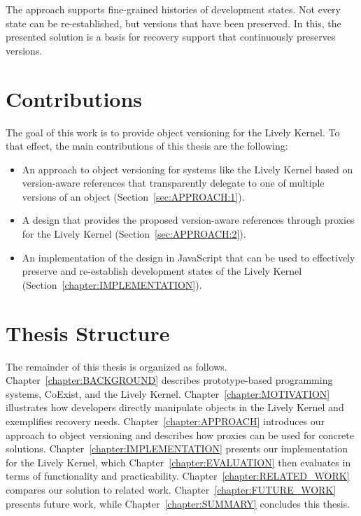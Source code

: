 The approach supports fine-grained histories of development states.
Not every state can be re-established, but versions that have been preserved.
In this, the presented solution is a basis for recovery support that continuously preserves versions.

\section{Contributions}

The goal of this work is to provide object versioning for the Lively Kernel.
To that effect, the main contributions of this thesis are the following:

\begin{itemize}
    \item An approach to object versioning for systems like the Lively Kernel based on version-aware references that transparently delegate to one of multiple versions of an object (Section~\ref{sec:APPROACH:1}).
    \item A design that provides the proposed version-aware references through proxies for the Lively Kernel (Section~\ref{sec:APPROACH:2}).
    \item An implementation of the design in JavaScript that can be used to effectively preserve and re-establish development states of the Lively Kernel (Section~\ref{chapter:IMPLEMENTATION}).
\end{itemize}


\section{Thesis Structure}

The remainder of this thesis is organized as follows. 
Chapter~\ref{chapter:BACKGROUND} describes prototype-based programming systems, CoExist, and the Lively Kernel.
Chapter~\ref{chapter:MOTIVATION} illustrates how developers directly manipulate objects in the Lively Kernel and exemplifies recovery needs.
Chapter~\ref{chapter:APPROACH} introduces our approach to object versioning and describes how proxies can be used for concrete solutions.
Chapter~\ref{chapter:IMPLEMENTATION} presents our implementation for the Lively Kernel, which Chapter~\ref{chapter:EVALUATION} then evaluates in terms of functionality and practicability.
Chapter~\ref{chapter:RELATED_WORK} compares our solution to related work.
Chapter~\ref{chapter:FUTURE_WORK} presents future work, while Chapter~\ref{chapter:SUMMARY} concludes this thesis.
